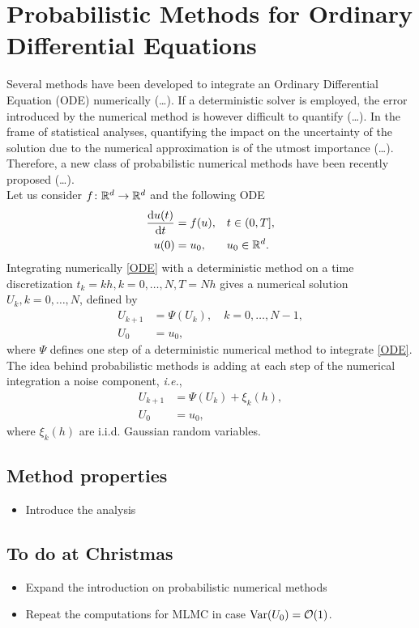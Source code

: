 \section{Probabilistic Methods for Ordinary Differential Equations}

Several methods have been developed to integrate an Ordinary Differential Equation (ODE) numerically (\ldots). If a deterministic solver is employed, the error introduced by the numerical method is however difficult to quantify (\ldots). In the frame of statistical analyses, quantifying the impact on the uncertainty of the solution due to the numerical approximation is of the utmost importance (\ldots). Therefore, a new class of probabilistic numerical methods have been recently proposed \cite{CGS16} (\ldots). \\
Let us consider $f\colon \mathbb{R}^d \to \mathbb{R}^d$ and the following ODE
\begin{equation}\label{ODE}
\begin{aligned}
	\dv{u(t)}{t} &= f(u), &&  t \in (0, T], \\
	u(0) &= u_0, && u_0 \in \mathbb{R}^d.
\end{aligned}
\end{equation}
Integrating numerically \eqref{ODE} with a deterministic method on a time discretization $t_k = kh, k = 0, \ldots, N, T = Nh$ gives a numerical solution $U_k, k = 0, \ldots, N$, defined by
\begin{equation}\label{numericalODE}
\begin{aligned}
	U_{k+1} &= \Psi(U_k), \quad k = 0, \ldots, N-1, \\
	U_{0} &= u_0, 
\end{aligned}
\end{equation}
where $\Psi$ defines one step of a deterministic numerical method to integrate \eqref{ODE}. \\
The idea behind probabilistic methods is adding at each step of the numerical integration a noise component, \textit{i.e.},
\begin{equation}\label{probabilityODE}
\begin{aligned}
	U_{k+1} &= \Psi(U_k) + \xi_k(h), \\
	U_0 &= u_0,
\end{aligned}
\end{equation}
where $\xi_k(h)$ are i.i.d. Gaussian random variables. 




\subsection{Method properties}
\begin{itemize}
	\item Introduce the analysis
\end{itemize}





\subsection{To do at Christmas}
\begin{itemize}
	\item Expand the introduction on probabilistic numerical methods
	\item Repeat the computations for MLMC in case $\operatorname{Var}(U_0) = \mathcal{O}(1)$. 
\end{itemize}

%

